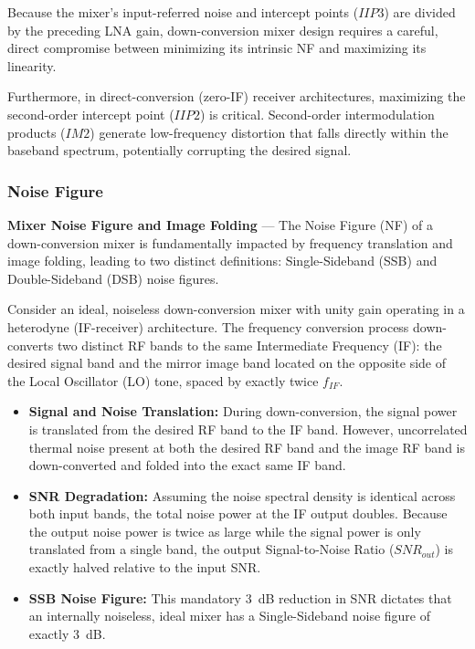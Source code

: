 Because the mixer's input-referred noise and intercept points ($IIP3$) are divided by the preceding LNA gain, down-conversion mixer design requires a careful, direct compromise between minimizing its intrinsic NF and maximizing its linearity.

Furthermore, in direct-conversion (zero-IF) receiver architectures, maximizing the second-order intercept point ($IIP2$) is critical. Second-order intermodulation products ($IM2$) generate low-frequency distortion that falls directly within the baseband spectrum, potentially corrupting the desired signal.

\subsubsection{Noise Figure}

\textbf{Mixer Noise Figure and Image Folding} --- The Noise Figure (NF) of a down-conversion mixer is fundamentally impacted by frequency translation and image folding, leading to two distinct definitions: Single-Sideband (SSB) and Double-Sideband (DSB) noise figures.

Consider an ideal, noiseless down-conversion mixer with unity gain operating in a heterodyne (IF-receiver) architecture. The frequency conversion process down-converts two distinct RF bands to the same Intermediate Frequency (IF): the desired signal band and the mirror image band located on the opposite side of the Local Oscillator (LO) tone, spaced by exactly twice $f_{IF}$.

\begin{itemize}
    \item \textbf{Signal and Noise Translation:} During down-conversion, the signal power is translated from the desired RF band to the IF band. However, uncorrelated thermal noise present at both the desired RF band and the image RF band is down-converted and folded into the exact same IF band.
    \item \textbf{SNR Degradation:} Assuming the noise spectral density is identical across both input bands, the total noise power at the IF output doubles. Because the output noise power is twice as large while the signal power is only translated from a single band, the output Signal-to-Noise Ratio ($SNR_{out}$) is exactly halved relative to the input SNR.
    \item \textbf{SSB Noise Figure:} This mandatory 3~dB reduction in SNR dictates that an internally noiseless, ideal mixer has a Single-Sideband noise figure of exactly 3~dB.
\end{itemize}

